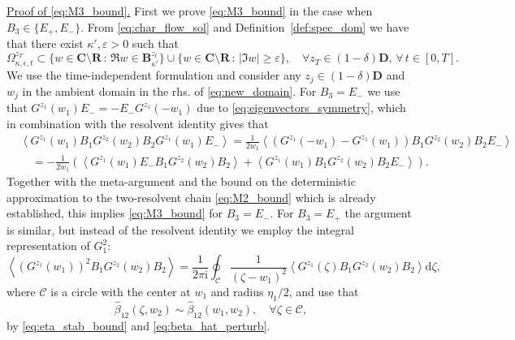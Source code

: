 \documentclass[10pt]{amsart}
\numberwithin{equation}{section}
\newcommand{\dif}{\mathrm{d}}
\newcommand{\R}{\mathbf{R}}
\newcommand{\C}{\mathbf{C}}
\newcommand{\ii}{\mathrm{i}}
\begin{document}
\noindent\underline{Proof of \eqref{eq:M3_bound}.} First we prove \eqref{eq:M3_bound} in the case when $B_3\in\{E_+,E_-\}$. From \eqref{eq:char_flow_sol} and Definition~\ref{def:spec_dom} we have that there exist $\kappa',\varepsilon>0$ such that
\begin{equation}
\Omega^{z_T}_{\kappa,\epsilon,t}\subset \{w\in \C\setminus\R\,:\, \Re w\in \mathbf{B}^{z_t}_{\kappa'}\}\cup\{w\in \C\setminus\R\,:\, |\Im w|\ge \varepsilon\},\quad \forall z_T\in (1-\delta)\mathbf{D},\,\forall\, t\in [0,T].
\label{eq:new_domain}
\end{equation}
We use the time-independent formulation and consider any $z_j\in (1-\delta)\mathbf{D}$ and $w_j$ in the ambient domain in the rhs. of \eqref{eq:new_domain}. For $B_3=E_-$ we use that $G^{z_1}(w_1)E_-=-E_-G^{z_1}(-w_1)$ due to \eqref{eq:eigenvectors_symmetry}, which in combination with the resolvent identity gives that
\begin{equation}
\begin{split}
&\left\langle G^{z_1}(w_1)B_1G^{z_2}(w_2)B_2G^{z_1}(w_1)E_-\right\rangle = \frac{1}{2w_1}\left\langle \left(G^{z_1}(-w_1)-G^{z_1}(w_1)\right)B_1G^{z_2}(w_2)B_2E_-\right\rangle \\
&\quad = -\frac{1}{2w_1}\left(\left\langle G^{z_1}(w_1)E_-B_1G^{z_2}(w_2)B_2\right\rangle + \left\langle G^{z_1}(w_1)B_1G^{z_2}(w_2) B_2E_-\right\rangle\right).
\end{split}
\end{equation}
Together with the meta-argument and the bound on the deterministic approximation to the two-resolvent chain \eqref{eq:M2_bound} which is already established, this implies \eqref{eq:M3_bound} for $B_3=E_-$. For $B_3=E_+$ the argument is similar, but instead of the resolvent identity we employ the integral representation of $G_1^2$:
\begin{equation}
\left\langle (G^{z_1}(w_1))^2 B_1G^{z_2}(w_2)B_2\right\rangle = \frac{1}{2\pi\ii} \oint_{\mathscr{C}} \frac{1}{(\zeta-w_1)^2}\left\langle G^{z_1}(\zeta)B_1G^{z_2}(w_2)B_2\right\rangle\dif \zeta, 
\end{equation}
where $\mathscr{C}$ is a circle with the center at $w_1$ and radius $\eta_1/2$, and use that 
\begin{equation}
\widehat{\beta}_{12}(\zeta,w_2)\sim \widehat{\beta}_{12}(w_1,w_2),\quad \forall \zeta\in\mathscr{C},
\end{equation}
by \eqref{eq:eta_stab_bound} and \eqref{eq:beta_hat_perturb}.
\end{document}
